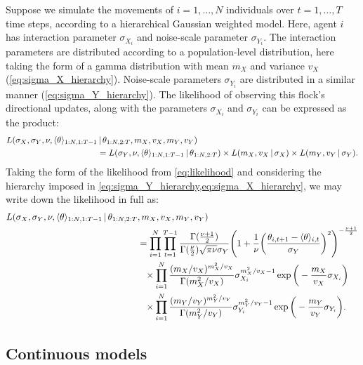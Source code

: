 Suppose we simulate the movements of $i=1,\ldots,N$ individuals over
$t=1,\ldots,T$ time steps, according to a hierarchical Gaussian weighted model.
Here, agent $i$ has interaction parameter $\sigma_{X_i}$ and noise-scale
parameter $\sigma_{Y_i}$. The interaction parameters are distributed according
to a population-level distribution, here taking the form of a gamma
distribution with mean $m_X$ and variance $v_X$ (\cref{eq:sigma_X_hierarchy}).
Noise-scale parameters $\sigma_{Y_i}$ are distributed in a similar manner
(\cref{eq:sigma_Y_hierarchy}). The likelihood of observing this flock's
directional updates, along with the parameters $\sigma_{X_i}$ and
$\sigma_{Y_i}$ can be expressed as the product:
\begin{align}
  \label{eq:hier_likelihood}
  \begin{split}
      L(\sigma_X, \sigma_Y, \nu, \langle\theta\rangle_{1:N,1:T-1} &\,|\, \theta_{1:N,2:T},
    m_X, v_X, m_Y, v_Y) \\
    &= L(\sigma_Y, \nu, \langle\theta\rangle_{1:N,1:T-1} \,|\, \theta_{1:N,2:T}) \times
    L(m_X, v_X \,|\, \sigma_X)
    \times
    L(m_Y, v_Y \,|\, \sigma_Y).
  \end{split}
\end{align}
Taking the form of the likelihood from \cref{eq:likelihood} and considering the
hierarchy imposed in \cref{eq:sigma_Y_hierarchy,eq:sigma_X_hierarchy}, we may
write down the likelihood in full as:
\begin{align}
  \begin{split}
      L(\sigma_X, \sigma_Y, \nu, \langle\theta\rangle_{1:N,1:T-1} \,|\, \theta_{1:N,2:T}&,
    m_X, v_X, m_Y, v_Y) \\
    &= \prod_{i=1}^N \prod_{t=1}^{T-1}
    \frac{\Gamma(\frac{\nu +1 }{2})}{\Gamma(\frac{\nu}{2})\sqrt{\pi\nu}\sigma_Y}
    \Bigg(1 + \frac{1}{\nu}
    \bigg(\frac{\theta_{i,t+1}-\langle\theta\rangle_{i,t}}{\sigma_Y}\bigg)^2
    \Bigg)^{-\frac{\nu+1}{2}}\\
    &\hphantom{=}\times\prod_{i=1}^N \frac{(m_X / v_X)^{m_X^2 / v_X}}{\Gamma(m_X^2/v_X)}
        \sigma_{X_i}^{m_X^2/v_X - 1} \exp\bigg(-\frac{m_X}{v_X}\sigma_{X_i}\bigg)\\
    &\hphantom{=}\times\prod_{i=1}^N \frac{(m_Y / v_Y)^{m_Y^2 / v_Y}}{\Gamma(m_Y^2/v_Y)}
        \sigma_{Y_i}^{m_Y^2/v_Y - 1} \exp\bigg(-\frac{m_Y}{v_Y}\sigma_{Y_i}\bigg).\\
  \end{split}
\end{align}

\subsection{Continuous models}

